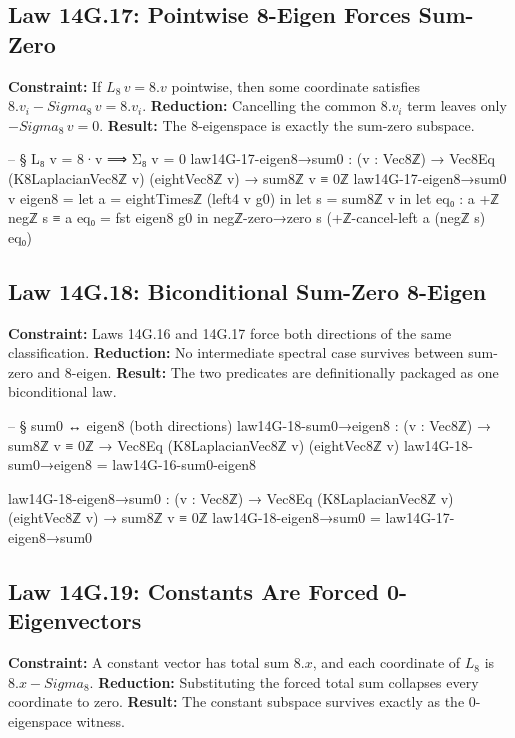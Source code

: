 \documentclass[11pt,a4paper]{book}
\def\Sigma{Sigma}%
\def\Leftrightarrow{<=>}%
\def\cdot{.}%
\def\texorpdfstring#1#2{#2}%
\begin{document}
\subsection{Law 14G.17: Pointwise 8-Eigen Forces Sum-Zero}

\textbf{Constraint:} If $L_8\,v = 8 \cdot v$ pointwise, then some coordinate satisfies
$8 \cdot v_i - \Sigma_8\,v = 8 \cdot v_i$.
\textbf{Reduction:} Cancelling the common $8 \cdot v_i$ term leaves only $-\Sigma_8\,v = 0$.
\textbf{Result:} The $8$-eigenspace is exactly the sum-zero subspace.

\begin{code}
-- § L₈ v = 8·v ⟹ Σ₈ v = 0
law14G-17-eigen8→sum0 : (v : Vec8ℤ) → Vec8Eq (K8LaplacianVec8ℤ v) (eightVec8ℤ v) → sum8ℤ v ≡ 0ℤ
law14G-17-eigen8→sum0 v eigen8 =
  let a = eightTimesℤ (left4 v g0) in
  let s = sum8ℤ v in
  let eq₀ : a +ℤ negℤ s ≡ a
      eq₀ = fst eigen8 g0
  in
  negℤ-zero→zero s (+ℤ-cancel-left a (negℤ s) eq₀)
\end{code}

\subsection{Law 14G.18: Biconditional Sum-Zero \texorpdfstring{$\Leftrightarrow$}{} 8-Eigen}

\textbf{Constraint:} Laws 14G.16 and 14G.17 force both directions of the same classification.
\textbf{Reduction:} No intermediate spectral case survives between sum-zero and $8$-eigen.
\textbf{Result:} The two predicates are definitionally packaged as one biconditional law.

\begin{code}
-- § sum0 ↔ eigen8 (both directions)
law14G-18-sum0→eigen8 : (v : Vec8ℤ) → sum8ℤ v ≡ 0ℤ → Vec8Eq (K8LaplacianVec8ℤ v) (eightVec8ℤ v)
law14G-18-sum0→eigen8 = law14G-16-sum0-eigen8

law14G-18-eigen8→sum0 : (v : Vec8ℤ) → Vec8Eq (K8LaplacianVec8ℤ v) (eightVec8ℤ v) → sum8ℤ v ≡ 0ℤ
law14G-18-eigen8→sum0 = law14G-17-eigen8→sum0
\end{code}

\subsection{Law 14G.19: Constants Are Forced 0-Eigenvectors}

\textbf{Constraint:} A constant vector has total sum $8 \cdot x$, and each coordinate of $L_8$ is
$8 \cdot x - \Sigma_8$.
\textbf{Reduction:} Substituting the forced total sum collapses every coordinate to zero.
\textbf{Result:} The constant subspace survives exactly as the $0$-eigenspace witness.
\end{document}
